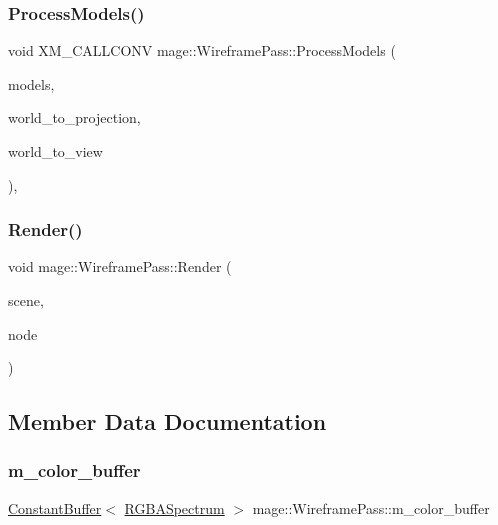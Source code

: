 \subsubsection{\texorpdfstring{Process\+Models()}{ProcessModels()}}
{\footnotesize\ttfamily void X\+M\+\_\+\+C\+A\+L\+L\+C\+O\+NV mage\+::\+Wireframe\+Pass\+::\+Process\+Models (\begin{DoxyParamCaption}\item[{const vector$<$ const \hyperlink{classmage_1_1_model_node}{Model\+Node} $\ast$ $>$ \&}]{models,  }\item[{F\+X\+M\+M\+A\+T\+R\+IX}]{world\+\_\+to\+\_\+projection,  }\item[{F\+X\+M\+M\+A\+T\+R\+IX}]{world\+\_\+to\+\_\+view }\end{DoxyParamCaption})\hspace{0.3cm}{\ttfamily [private]}, {\ttfamily [noexcept]}}

\hypertarget{classmage_1_1_wireframe_pass_a75135a847466cccd034d9a0c71338cf2}{}\label{classmage_1_1_wireframe_pass_a75135a847466cccd034d9a0c71338cf2} 
\subsubsection{\texorpdfstring{Render()}{Render()}}
{\footnotesize\ttfamily void mage\+::\+Wireframe\+Pass\+::\+Render (\begin{DoxyParamCaption}\item[{const \hyperlink{structmage_1_1_pass_buffer}{Pass\+Buffer} $\ast$}]{scene,  }\item[{const \hyperlink{classmage_1_1_camera_node}{Camera\+Node} $\ast$}]{node }\end{DoxyParamCaption})}



\subsection{Member Data Documentation}
\hypertarget{classmage_1_1_wireframe_pass_ab046a411db5ef3cd9c291ea1bea7cdbc}{}\label{classmage_1_1_wireframe_pass_ab046a411db5ef3cd9c291ea1bea7cdbc} 
\subsubsection{\texorpdfstring{m\+\_\+color\+\_\+buffer}{m\_color\_buffer}}
{\footnotesize\ttfamily \hyperlink{structmage_1_1_constant_buffer}{Constant\+Buffer}$<$ \hyperlink{structmage_1_1_r_g_b_a_spectrum}{R\+G\+B\+A\+Spectrum} $>$ mage\+::\+Wireframe\+Pass\+::m\+\_\+color\+\_\+buffer\hspace{0.3cm}{\ttfamily [private]}}

